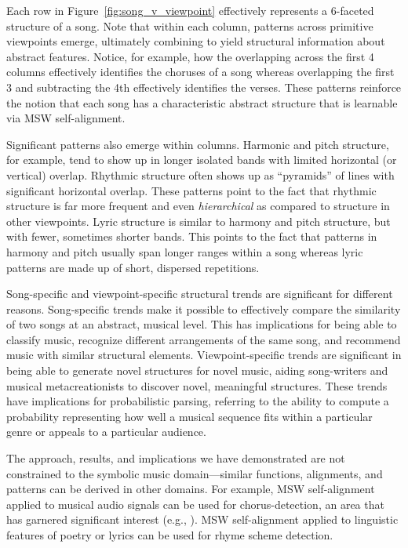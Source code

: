 \documentclass[phd,electronic,oneside,twosidetoc,letterpaper,chaptercenter,parttop,lol,lof,lot]{byumsphd}
\begin{document}
Each row in Figure~\ref{fig:song_v_viewpoint} effectively represents a 6-faceted structure of a song. Note that within each column, patterns across primitive viewpoints emerge, ultimately combining to yield structural information about abstract features. Notice, for example, how the overlapping across the first 4 columns effectively identifies the choruses of a song whereas overlapping the first 3 and subtracting the 4th effectively identifies the verses. These patterns reinforce the notion that each song has a characteristic abstract structure that is learnable via MSW self-alignment.

Significant patterns also emerge within columns. Harmonic and pitch structure, for example, tend to show up in longer isolated bands with limited horizontal (or vertical) overlap. Rhythmic structure often shows up as ``pyramids'' of lines with significant horizontal overlap. These patterns point to the fact that rhythmic structure is far more frequent and even \textit{hierarchical} as compared to structure in other viewpoints. Lyric structure is similar to harmony and pitch structure, but with fewer, sometimes shorter bands. This points to the fact that patterns in harmony and pitch usually span longer ranges within a song whereas lyric patterns are made up of short, dispersed repetitions.

Song-specific and viewpoint-specific structural trends are significant for different reasons. Song-specific trends make it possible to effectively compare the similarity of two songs at an abstract, musical level. This has implications for being able to classify music, recognize different arrangements of the same song, and recommend music with similar structural elements. Viewpoint-specific trends are significant in being able to generate novel structures for novel music, aiding song-writers and musical metacreationists to discover novel, meaningful structures. These trends have implications for probabilistic parsing, referring to the ability to compute a probability representing how well a musical sequence fits within a particular genre or appeals to a particular audience.

The approach, results, and implications we have demonstrated are not constrained to the symbolic music domain---similar functions, alignments, and patterns can be derived in other domains. For example, MSW self-alignment applied to musical audio signals can be used for chorus-detection, an area that has garnered significant interest (e.g., \cite{gao2015octave}). MSW self-alignment applied to linguistic features of poetry or lyrics can be used for rhyme scheme detection.
\end{document}
